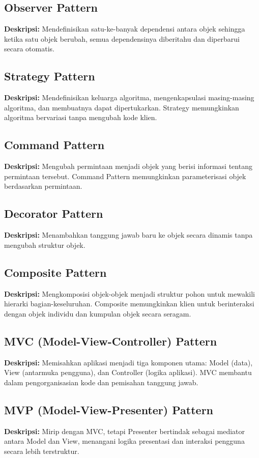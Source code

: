 \documentclass[12pt]{article}
\begin{document}
\subsection{Observer Pattern}
\textbf{Deskripsi:} Mendefinisikan satu-ke-banyak dependensi antara objek sehingga ketika satu objek berubah, semua dependensinya diberitahu dan diperbarui secara otomatis.

\subsection{Strategy Pattern}
\textbf{Deskripsi:} Mendefinisikan keluarga algoritma, mengenkapsulasi masing-masing algoritma, dan membuatnya dapat dipertukarkan. Strategy memungkinkan algoritma bervariasi tanpa mengubah kode klien.

\subsection{Command Pattern}
\textbf{Deskripsi:} Mengubah permintaan menjadi objek yang berisi informasi tentang permintaan tersebut. Command Pattern memungkinkan parameterisasi objek berdasarkan permintaan.

\subsection{Decorator Pattern}
\textbf{Deskripsi:} Menambahkan tanggung jawab baru ke objek secara dinamis tanpa mengubah struktur objek.

\subsection{Composite Pattern}
\textbf{Deskripsi:} Mengkomposisi objek-objek menjadi struktur pohon untuk mewakili hierarki bagian-keseluruhan. Composite memungkinkan klien untuk berinteraksi dengan objek individu dan kumpulan objek secara seragam.

\subsection{MVC (Model-View-Controller) Pattern}
\textbf{Deskripsi:} Memisahkan aplikasi menjadi tiga komponen utama: Model (data), View (antarmuka pengguna), dan Controller (logika aplikasi). MVC membantu dalam pengorganisasian kode dan pemisahan tanggung jawab.

\subsection{MVP (Model-View-Presenter) Pattern}
\textbf{Deskripsi:} Mirip dengan MVC, tetapi Presenter bertindak sebagai mediator antara Model dan View, menangani logika presentasi dan interaksi pengguna secara lebih terstruktur.
\end{document}
